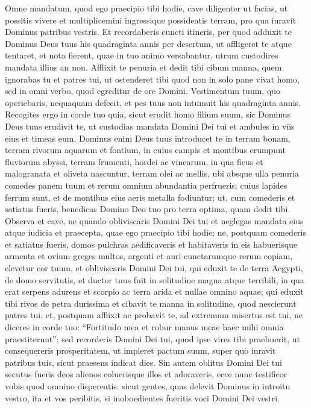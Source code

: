 \begin{biblechapter} 
\verse Omne mandatum, quod ego praecipio tibi hodie, cave diligenter ut facias, ut possitis vivere et multiplicemini ingressique possideatis terram, pro qua iuravit Dominus patribus vestris. 
\verse Et recordaberis cuncti itineris, per quod adduxit te Dominus Deus tuus his quadraginta annis per desertum, ut affligeret te atque tentaret, et nota fierent, quae in tuo animo versabantur, utrum custodires mandata illius an non. 
\verse Afflixit te penuria et dedit tibi cibum manna, quem ignorabas tu et patres tui, ut ostenderet tibi quod non in solo pane vivat homo, sed in omni verbo, quod egreditur de ore Domini. 
\verse Vestimentum tuum, quo operiebaris, nequaquam defecit, et pes tuus non intumuit his quadraginta annis. 
\verse Recogites ergo in corde tuo quia, sicut erudit homo filium suum, sic Dominus Deus tuus erudivit te, 
\verse ut custodias mandata Domini Dei tui et ambules in viis eius et timeas eum. 
\verse Dominus enim Deus tuus introducet te in terram bonam, terram rivorum aquarum et fontium, in cuius campis et montibus erumpunt fluviorum abyssi, 
\verse terram frumenti, hordei ac vinearum, in qua ficus et malogranata et oliveta nascuntur, terram olei ac mellis, 
\verse ubi absque ulla penuria comedes panem tuum et rerum omnium abundantia perfrueris; cuius lapides ferrum sunt, et de montibus eius aeris metalla fodiuntur; 
\verse ut, cum comederis et satiatus fueris, benedicas Domino Deo tuo pro terra optima, quam dedit tibi. 
\verse Observa et cave, ne quando obliviscaris Domini Dei tui et neglegas mandata eius atque iudicia et praecepta, quae ego praecipio tibi hodie; 
\verse ne, postquam comederis et satiatus fueris, domos pulchras aedificaveris et habitaveris in eis 
\verse habuerisque armenta et ovium greges multos, argenti et auri cunctarumque rerum copiam, 
\verse elevetur cor tuum, et obliviscaris Domini Dei tui, qui eduxit te de terra Aegypti, de domo servitutis, 
\verse et ductor tuus fuit in solitudine magna atque terribili, in qua erat serpens adurens et scorpio ac terra arida et nullae omnino aquae; qui eduxit tibi rivos de petra durissima  
\verse et cibavit te manna in solitudine, quod nescierunt patres tui, et, postquam afflixit ac probavit te, ad extremum misertus est tui, 
\verse ne diceres in corde tuo: “Fortitudo mea et robur manus meae haec mihi omnia praestiterunt”;  
\verse sed recorderis Domini Dei tui, quod ipse vires tibi praebuerit, ut consequereris prosperitatem, ut impleret pactum suum, super quo iuravit patribus tuis, sicut praesens indicat dies. 
\verse Sin autem oblitus Domini Dei tui secutus fueris deos alienos coluerisque illos et adoraveris, ecce nunc testificor vobis quod omnino dispereatis: 
\verse sicut gentes, quas delevit Dominus in introitu vestro, ita et vos peribitis, si inoboedientes fueritis voci Domini Dei vestri. 
\end{biblechapter}

